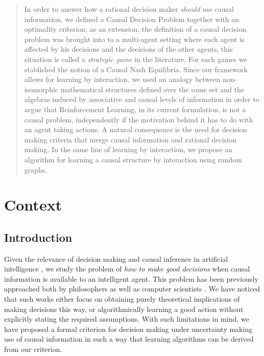 \documentclass[english,letterpaper,12pt,final]{article}
\theoremstyle{definition}
\begin{document}

\singlespacing
\tableofcontents
\newpage
\begin{abstract}
In order to answer how a rational decision maker \textit{should} use causal information, we defined a Causal Decision Problem together with an optimality criterion; as an extension, the definition of a causal decision problem was brought into to a multi-agent setting where each agent is affected by his decisions and the decisions of the other agents, this situation is called a \textit{strategic game} in the literature. For such games we stablished the notion of a Causal Nash Equilibria. Since our framework allows for learning by interaction, we used an analogy between non-isomorphic mathematical structures defined over the same set and the algebras induced by associative and causal levels of information in order to argue that Reinforcement Learning, in its current formulation, is not a causal problem, independently if the motivation behind it has to do with an agent taking actions. A natural consequence is the need for decision making criteria that merge causal information and rational decision making. In the same line of learning by interaction, we propose an algorithm for learning a causal structure by interaction using random graphs. 
\end{abstract}

\section{Context}
\subsection{Introduction}
Given the relevance of decision making and causal inference in artificial intelligence \citep{lake2017building,pearl2018why}, we study the problem of \textit{how to make good decisions} when causal information is available to an intelligent agent. This problem has been previously approached both by philosophers \citep{lewis1981causal,stalnaker1968,joyce1999foundations, waldmann2013causal,danks2014unifying} as well as computer scientists \citep{pearl2009causality,bareinboim2015bandits,ortega2015causal,lattimoreNIPS2016,sen2017identifying}. We have noticed that such works either focus on obtaining purely theoretical implications of making decisions this way, or algorithmically learning a good action without explicitly stating the required assumptions. With such limitations in mind, we have proposed a formal criterion for decision making under uncertainty making use of causal information in such a way that learning algorithms can be derived from our criterion.
\end{document}
